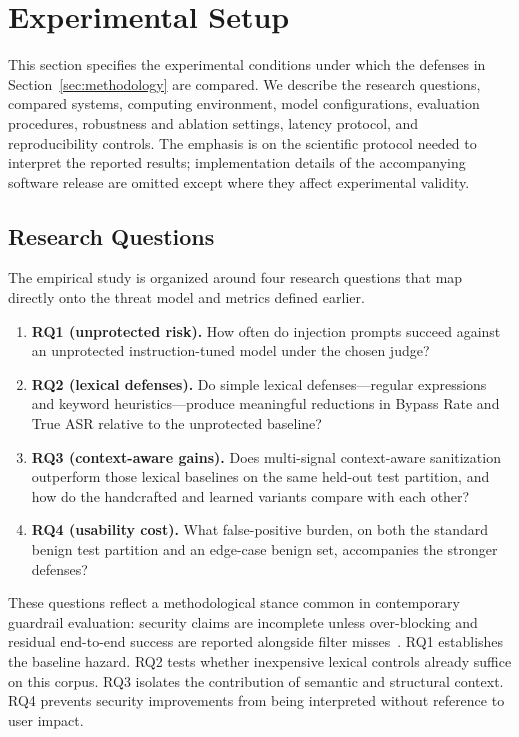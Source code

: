 
\section{Experimental Setup}
\label{sec:experimental-setup}

This section specifies the experimental conditions under which the defenses in Section~\ref{sec:methodology} are compared.
We describe the research questions, compared systems, computing environment, model configurations, evaluation procedures, robustness and ablation settings, latency protocol, and reproducibility controls.
The emphasis is on the scientific protocol needed to interpret the reported results; implementation details of the accompanying software release are omitted except where they affect experimental validity.

\subsection{Research Questions}
\label{sec:rq}

The empirical study is organized around four research questions that map directly onto the threat model and metrics defined earlier.

\begin{enumerate}
  \item \textbf{RQ1 (unprotected risk).}
    How often do injection prompts succeed against an unprotected instruction-tuned model under the chosen judge?
  \item \textbf{RQ2 (lexical defenses).}
    Do simple lexical defenses---regular expressions and keyword heuristics---produce meaningful reductions in Bypass Rate and True ASR relative to the unprotected baseline?
  \item \textbf{RQ3 (context-aware gains).}
    Does multi-signal context-aware sanitization outperform those lexical baselines on the same held-out test partition, and how do the handcrafted and learned variants compare with each other?
  \item \textbf{RQ4 (usability cost).}
    What false-positive burden, on both the standard benign test partition and an edge-case benign set, accompanies the stronger defenses?
\end{enumerate}

These questions reflect a methodological stance common in contemporary guardrail evaluation: security claims are incomplete unless over-blocking and residual end-to-end success are reported alongside filter misses~\cite{zizzo2025adversarial,promptfoo2024owasp,owasp_llm}.
RQ1 establishes the baseline hazard.
RQ2 tests whether inexpensive lexical controls already suffice on this corpus.
RQ3 isolates the contribution of semantic and structural context.
RQ4 prevents security improvements from being interpreted without reference to user impact.

